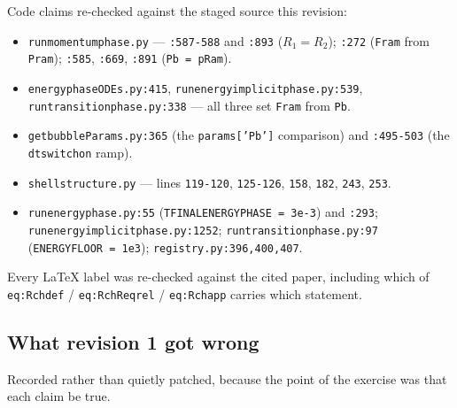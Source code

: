 \documentclass[11pt,a4paper,oneside]{report}
\newcommand{\brkus}{\textunderscore\allowbreak}
\newcommand{\code}[1]{\texttt{\small\let\_\brkus #1}}
\newcommand{\lbl}[1]{\texttt{\footnotesize\let\_\brkus #1}}
\begin{document}
Code claims re-checked against the staged source this revision:

\begin{itemize}\small\raggedright
\item \code{run\_momentum\_phase.py} --- \code{:587-588} and \code{:893} ($R_1=R_2$);
      \code{:272} (\code{F\_ram} from \code{P\_ram});
      \code{:585}, \code{:669}, \code{:891} (\code{Pb = pRam}).
\item \code{energy\_phase\_ODEs.py:415}, \code{run\_energy\_implicit\_phase.py:539},
      \code{run\_transition\_phase.py:338} --- all three set \code{F\_ram} from \code{Pb}.
\item \code{get\_bubbleParams.py:365} (the \code{params['Pb']} comparison) and
      \code{:495-503} (the \code{dt\_switchon} ramp).
\item \code{shell\_structure.py} --- lines \code{119-120}, \code{125-126}, \code{158},
      \code{182}, \code{243}, \code{253}.
\item \code{run\_energy\_phase.py:55} (\code{TFINAL\_ENERGY\_PHASE = 3e-3}) and \code{:293};
      \code{run\_energy\_implicit\_phase.py:1252};
      \code{run\_transition\_phase.py:97} (\code{ENERGY\_FLOOR = 1e3});
      \code{registry.py:396,400,407}.
\end{itemize}

Every \LaTeX{} label was re-checked against the cited paper, including which of
\lbl{eq:Rch\_def} / \lbl{eq:Rch\_Req\_rel} / \lbl{eq:Rch\_app} carries which statement.

\subsection{What revision 1 got wrong}
\label{sec:errata}

Recorded rather than quietly patched, because the point of the exercise was that each claim
be true.
\end{document}
